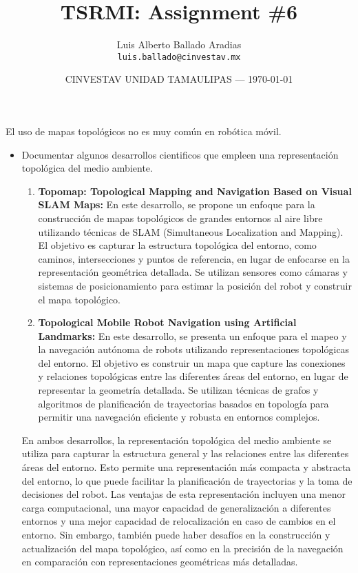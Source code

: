 \documentclass{article}
\title{TSRMI: Assignment \#6} %
\author{Luis Alberto Ballado Aradias\\ \texttt{luis.ballado@cinvestav.mx}} %
\date{CINVESTAV UNIDAD TAMAULIPAS --- \today} %
\begin{document}
\maketitle %

El uso de mapas topológicos no es muy común en robótica móvil.\\

\begin{itemize} %
\item Documentar algunos desarrollos cientificos que empleen una representación topológica del medio ambiente.

  \begin{enumerate}
  \item \textbf{Topomap: Topological Mapping and Navigation Based on Visual SLAM Maps:} En este desarrollo, se propone un enfoque para la construcción de mapas topológicos de grandes entornos al aire libre utilizando técnicas de SLAM (Simultaneous Localization and Mapping). El objetivo es capturar la estructura topológica del entorno, como caminos, intersecciones y puntos de referencia, en lugar de enfocarse en la representación geométrica detallada. Se utilizan sensores como cámaras y sistemas de posicionamiento para estimar la posición del robot y construir el mapa topológico.
    
  \item \textbf{Topological Mobile Robot Navigation using Artificial Landmarks:} En este desarrollo, se presenta un enfoque para el mapeo y la navegación autónoma de robots utilizando representaciones topológicas del entorno. El objetivo es construir un mapa que capture las conexiones y relaciones topológicas entre las diferentes áreas del entorno, en lugar de representar la geometría detallada. Se utilizan técnicas de grafos y algoritmos de planificación de trayectorias basados en topología para permitir una navegación eficiente y robusta en entornos complejos.
    
  \end{enumerate}

  En ambos desarrollos, la representación topológica del medio ambiente se utiliza para capturar la estructura general y las relaciones entre las diferentes áreas del entorno. Esto permite una representación más compacta y abstracta del entorno, lo que puede facilitar la planificación de trayectorias y la toma de decisiones del robot. Las ventajas de esta representación incluyen una menor carga computacional, una mayor capacidad de generalización a diferentes entornos y una mejor capacidad de relocalización en caso de cambios en el entorno. Sin embargo, también puede haber desafíos en la construcción y actualización del mapa topológico, así como en la precisión de la navegación en comparación con representaciones geométricas más detalladas.
    

\end{itemize}
\end{document}
